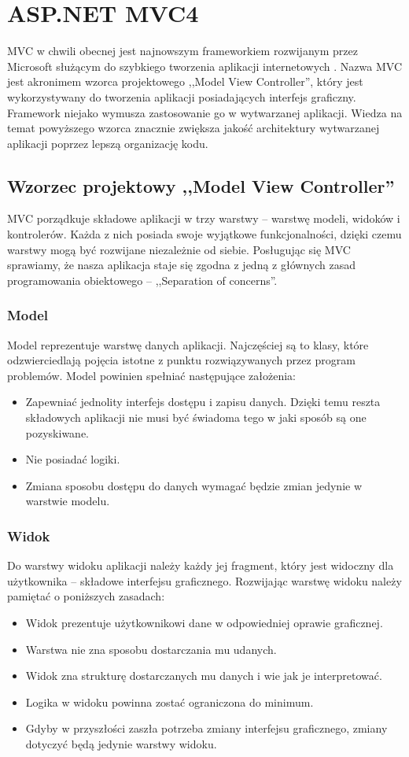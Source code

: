 \chapter{ASP.NET MVC4}
MVC w chwili obecnej jest najnowszym frameworkiem rozwijanym przez Microsoft służącym do szybkiego tworzenia aplikacji internetowych \cite{mvc-book}. Nazwa MVC jest akronimem wzorca projektowego ,,Model View Controller'', który jest wykorzystywany do tworzenia aplikacji posiadających interfejs graficzny. Framework niejako wymusza zastosowanie go w wytwarzanej aplikacji. Wiedza na temat powyższego wzorca znacznie zwiększa jakość architektury wytwarzanej aplikacji poprzez lepszą organizację kodu.

\section{Wzorzec projektowy ,,Model View Controller''}
MVC porządkuje składowe aplikacji w trzy warstwy -- warstwę modeli, widoków i kontrolerów. Każda z nich posiada swoje wyjątkowe funkcjonalności, dzięki czemu warstwy mogą być rozwijane niezależnie od siebie. Posługując się MVC sprawiamy, że nasza aplikacja staje się zgodna z jedną z głównych zasad programowania obiektowego -- ,,Separation of concerns''\cite{mvc-book}.

\subsection{Model}
Model reprezentuje warstwę danych aplikacji. Najczęściej są to klasy, które odzwierciedlają pojęcia istotne z punktu rozwiązywanych przez program problemów. Model powinien spełniać następujące założenia:
\begin{itemize}
\item Zapewniać jednolity interfejs dostępu i zapisu danych. Dzięki temu reszta składowych aplikacji nie musi być świadoma tego w jaki sposób są one pozyskiwane.
\item Nie posiadać logiki.
\item Zmiana sposobu dostępu do danych wymagać będzie zmian jedynie w warstwie modelu.
\end{itemize}

\subsection{Widok}
Do warstwy widoku aplikacji należy każdy jej fragment, który jest widoczny dla użytkownika -- składowe interfejsu graficznego. Rozwijając warstwę widoku należy pamiętać o poniższych zasadach:
\begin{itemize}
\item Widok prezentuje użytkownikowi dane w odpowiedniej oprawie graficznej.
\item Warstwa nie zna sposobu dostarczania mu udanych.
\item Widok zna strukturę dostarczanych mu danych i wie jak je interpretować.
\item Logika w widoku powinna zostać ograniczona do minimum.
\item Gdyby w przyszłości zaszła potrzeba zmiany interfejsu graficznego, zmiany dotyczyć będą jedynie warstwy widoku.
\end{itemize}


